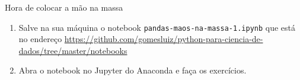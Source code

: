 \begin{frame}[t, fragile]{Hora de colocar a mão na massa}
  \begin{enumerate}
  \item Salve na sua máquina o notebook \verb!pandas-maos-na-massa-1.ipynb! que está no endereço \url{https://github.com/gomesluiz/python-para-ciencia-de-dados/tree/master/notebooks}
  \item Abra o notebook no Jupyter do Anaconda e faça os exercícios.
  \end{enumerate}
\end{frame}